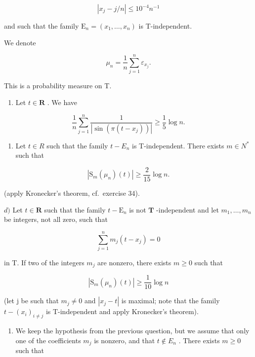 \[
\left| x _ {j} - j / n \right| \leqslant 1 0 ^ {- 4} n ^ {- 1}
\]

and such that the family \(\mathrm{E}_{n}=(x_{1},\ldots,x_{n})\) is T-independent.

We denote

\[
\mu_ {n} = \frac {1}{n} \sum_ {j = 1} ^ {n} \varepsilon_ {x _ {j}}.
\]

This is a probability measure on T.

\begin{enumerate}
\def\labelenumi{\alph{enumi})}
\setcounter{enumi}{1}
\tightlist
\item
  Let \(t\in \mathbf{R}\) . We have
\end{enumerate}

\[
\frac {1}{n} \sum_ {j = 1} ^ {n} \frac {1}{| \sin (\pi (t - x _ {j})) |} \geqslant \frac {1}{5} \log n.
\]

\begin{enumerate}
\def\labelenumi{\alph{enumi})}
\setcounter{enumi}{2}
\tightlist
\item
  Let \(t \in R\) such that the family \(t - E_{n}\) is T-independent. There exists \(m \in N^{*}\) such that
\end{enumerate}

\[
| \mathrm{S} _ {m} (\mu_ {n}) (t) | \geqslant \frac {2}{1 5} \log n.
\]

(apply Kronecker's theorem, cf.~exercise 34).

\(d)\) Let \(t \in \mathbf{R}\) such that the family \(t - \mathrm{E}_n\) is not \(\mathbf{T}\) -independent and let \(m_1, \ldots, m_n\) be integers, not all zero, such that

\[
\sum_ {j = 1} ^ {n} m _ {j} (t - x _ {j}) = 0
\]

in T. If two of the integers \(m_{j}\) are nonzero, there exists \(m \geqslant 0\) such that

\[
| \mathrm{S} _ {m} (\mu_ {n}) (t) | \geqslant \frac {1}{1 0} \log n
\]

(let j be such that \(m_{j} \neq 0\) and \(|x_{j} - t|\) is maximal; note that the family \(t - (x_{i})_{i \neq j}\) is T-independent and apply Kronecker's theorem).

\begin{enumerate}
\def\labelenumi{\alph{enumi})}
\setcounter{enumi}{4}
\tightlist
\item
  We keep the hypothesis from the previous question, but we assume that only one of the coefficients \(m_{j}\) is nonzero, and that \(t \notin E_{n}\) . There exists \(m \geqslant 0\) such that
\end{enumerate}

